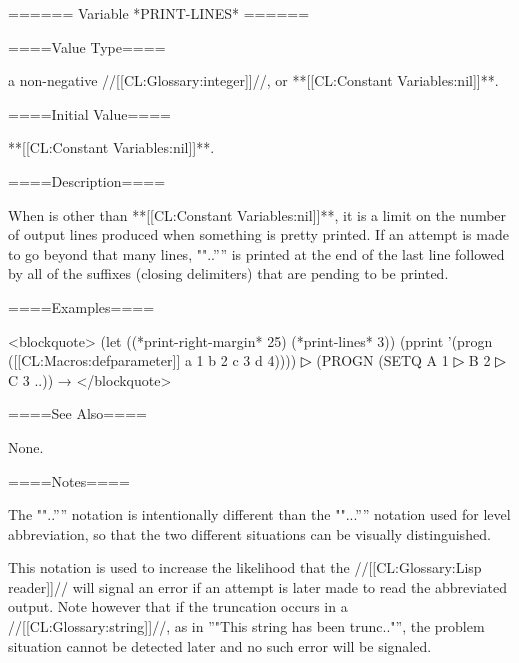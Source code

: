====== Variable *PRINT-LINES* ======

====Value Type====

a non-negative //[[CL:Glossary:integer]]//, or **[[CL:Constant Variables:nil]]**.

====Initial Value====

**[[CL:Constant Variables:nil]]**.

====Description====

When  is other than **[[CL:Constant Variables:nil]]**, it is a limit on the number of output lines produced when something is pretty printed. If an attempt is made to go beyond that many lines, ""..'''' is printed at the end of the last line followed by all of the suffixes (closing delimiters) that are pending to be printed.

====Examples====

<blockquote> (let ((*print-right-margin* 25) (*print-lines* 3)) (pprint '(progn ([[CL:Macros:defparameter]] a 1 b 2 c 3 d 4))))
▷ (PROGN (SETQ A 1
▷ B 2
▷ C 3 ..)) → \novalues </blockquote>

====See Also====

None.

====Notes====

The ""..'''' notation is intentionally different than the ""...'''' notation used for level abbreviation, so that the two different situations can be visually distinguished.

This notation is used to increase the likelihood that the //[[CL:Glossary:Lisp reader]]// will signal an error if an attempt is later made to read the abbreviated output. Note however that if the truncation occurs in a //[[CL:Glossary:string]]//, as in ''"This string has been trunc.."'', the problem situation cannot be detected later and no such error will be signaled.

